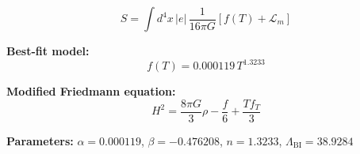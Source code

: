 
\begin{equation}
  S = \int d^4x \, |e| \, \frac{1}{16\pi G} \left[ f(T) + \mathcal{L}_m \right]
\end{equation}

\textbf{Best-fit model:}
\begin{equation}
  f(T) = 0.000119 \, T^{1.3233}
\end{equation}

\textbf{Modified Friedmann equation:}
\begin{equation}
  H^2 = \frac{8\pi G}{3} \rho - \frac{f}{6} + \frac{T f_T}{3}
\end{equation}

\textbf{Parameters:}
$\alpha = 0.000119$, \quad
$\beta = -0.476208$, \quad
$n = 1.3233$, \quad
$\Lambda_{\text{BI}} = 38.9284$